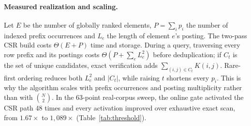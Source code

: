 \paragraph*{Measured realization and scaling.}
Let $E$ be the number of globally ranked elements, $P=\sum_i p_i$ the number of indexed prefix
occurrences and $L_e$ the length of element $e$'s posting. The two-pass CSR build costs
$\Theta(E+P)$ time and storage. During a query, traversing every row prefix and its postings costs
$\Theta(P+\sum_e L_e^2)$ before deduplication; if $C_t$ is the set of unique candidates, exact
verification adds $\sum_{(i,j)\in C_t}K(i,j)$. Rare-first ordering reduces both $L_e^2$ and
$|C_t|$, while raising $t$ shortens every $p_i$. This is why the algorithm scales with prefix
occurrences and posting multiplicity rather than with $\binom{N}{2}$. In the 63-point real-corpus
sweep, the online gate activated the CSR path 48 times and every activation improved over exhaustive
exact scan, from $1.67\times$ to $1{,}089\times$ (Table~\ref{tab:threshold}).

